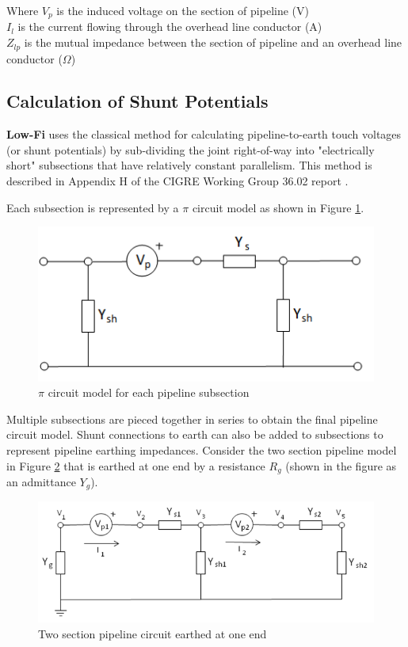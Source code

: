 \documentclass{article}
\begin{document}
Where $V_p$ is the induced voltage on the section of pipeline (V) \\
\hphantom{Where} $I_{l}$ is the current flowing through the overhead line conductor (A) \\
\hphantom{Where} $Z_{lp}$ is the mutual impedance between the section of pipeline and an overhead line conductor ($\Omega$)

\subsection{Calculation of Shunt Potentials}
\textbf{Low-Fi} uses the classical method for calculating pipeline-to-earth touch voltages (or shunt potentials) by sub-dividing the joint right-of-way into "electrically short" subsections that have relatively constant parallelism. This method is described in Appendix H of the CIGRE Working Group 36.02 report \cite{cigre_1995}.

Each subsection is represented by a $\pi$ circuit model as shown in Figure \ref{fig:pi_section}.

\begin{figure}
\begin{center}
\caption{$\pi$ circuit model for each pipeline subsection}
\label{fig:pi_section}
\includegraphics[scale=0.6]{./Figures/pi_section.png}
\end{center}
\end{figure}

Multiple subsections are pieced together in series to obtain the final pipeline circuit model. Shunt connections to earth can also be added to subsections to represent pipeline earthing impedances. Consider the two section pipeline model in Figure \ref{fig:two_section} that is earthed at one end by a resistance $R_g$ (shown in the figure as an admittance $Y_g$).

\begin{figure}
\begin{center}
\caption{Two section pipeline circuit earthed at one end}
\label{fig:two_section}
\includegraphics[width=\linewidth]{./Figures/two_section_pipe.png}
\end{center}
\end{figure}
\end{document}
